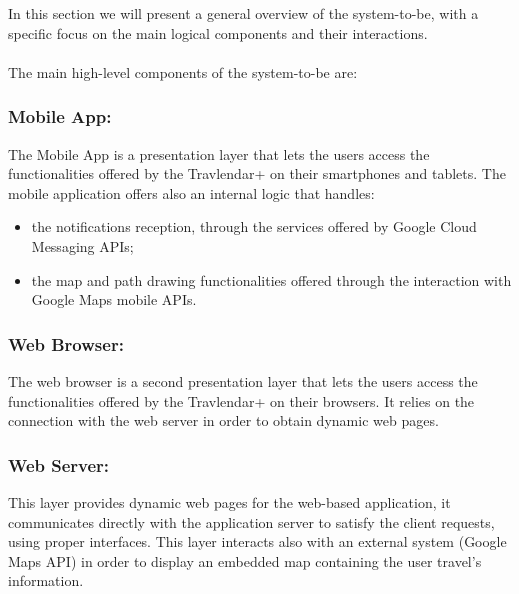 In this section we will present a general overview of the system-to-be, with a specific focus on the main logical components and their interactions. \\ \\
The main high-level components of the system-to-be are:
\subsubsection{Mobile App:}
\label{subsubsect:Mobile App}
The Mobile App is a presentation layer that lets the users access the functionalities offered by the Travlendar+ on their smartphones and tablets. The mobile application offers also an internal logic that handles:
\begin{itemize}
	\item the notifications reception, through the services offered by Google Cloud Messaging APIs;
	\item the map and path drawing functionalities offered through the interaction with Google Maps mobile APIs.
\end{itemize}  

\subsubsection{Web Browser:}
\label{subsubsect:Web Browser}
The web browser is a second presentation layer that lets the users access the functionalities offered by the Travlendar+ on their browsers.
It relies on the connection with the web server in order to obtain dynamic web pages.

\subsubsection{Web Server:}
\label{subsubsect:Web Server}
This layer provides dynamic web pages for the web-based application, it communicates directly with the application server to satisfy the client requests, using proper interfaces. This layer interacts also with an external system (Google Maps API) in order to display an embedded map containing the user travel's information.

